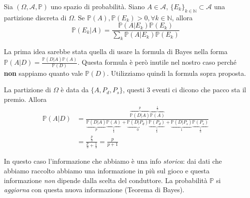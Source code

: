 \begin{enumerate}
\begin{theorem}
Sia $( \Omega ,\mathcal{A} ,\mathbb{P})$ uno spazio di probabilità. Siano $A\in \mathcal{A}$, $\{E_{k}\}_{k\in \mathbb{N}} \subset \mathcal{A}$ una partizione discreta di $\Omega $. Se $\mathbb{P}( A) ,\mathbb{P}( E_{k})  >0,\forall k\in \mathbb{N}$, allora
\begin{equation*}
\mathbb{P}( E_{k} |A) =\frac{\mathbb{P}( A|E_{k})\mathbb{P}( E_{k})}{\sum\nolimits _{k}\mathbb{P}( A|E_{k})\mathbb{P}( E_{k})}
\end{equation*}
\end{theorem}

\begin{oss}
La prima idea sarebbe stata quella di usare la formula di Bayes nella forma $\mathbb{P}( A|D) =\frac{\mathbb{P}( D|A)\mathbb{P}( A)}{\mathbb{P}( D)}$. Questa formula è però inutile nel nostro caso perché \textbf{non} sappiamo quanto vale $\mathbb{P}( D)$. Utilizziamo quindi la formula sopra proposta.
\end{oss}

La partizione di $\Omega $ è data da $\{A,P_{d} ,P_{s}\}$, questi $3$ eventi ci dicono che pacco sta il premio. Allora\begin{equation*}
\begin{aligned}
\mathbb{P}( A|D) & =\frac{\overbrace{\mathbb{P}( D|A)}^{p}\overbrace{\mathbb{P}( A)}^{\frac{1}{3}}}{\underbrace{\mathbb{P}( D|A)}_{p}\underbrace{\mathbb{P}( A)}_{\frac{1}{3}} +\underbrace{\mathbb{P}( D|P_{d})}_{0}\underbrace{\mathbb{P}( P_{d})}_{\frac{1}{3}} +\underbrace{\mathbb{P}( D|P_{s})}_{1}\underbrace{\mathbb{P}( P_{s})}_{\frac{1}{3}}}\\
 & =\frac{\frac{p}{3}}{\frac{p}{3} +\frac{1}{3}} =\frac{p}{p+1}
\end{aligned}
\end{equation*}

\begin{oss}
In questo caso l'informazione che abbiamo è una info \textit{storica}: dai dati che abbiamo raccolto abbiamo una informazione in più sul gioco e questa informazione \textit{non} dipende dalla scelta del conduttore. La probabilità $\mathbb{P}$ si \textit{aggiorna} con questa nuova informazione (Teorema di Bayes).
\end{oss}


\end{enumerate}

